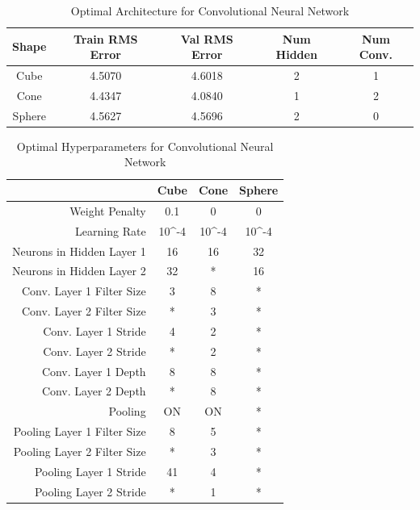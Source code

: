\documentclass[journal]{IEEEtran}
\begin{document}
\begin{table}
	\caption{Optimal Architecture for Convolutional Neural Network}
	\label{CNN_Params}
\begin{tabular}{|c|c|c|c|c|}
	\hline
	Shape & Train RMS Error & Val RMS Error & Num Hidden & Num Conv. \\
	\hline
	Cube & 4.5070 & 4.6018 & 2 & 1  \\
	Cone & 4.4347 & 4.0840 & 1 & 2\\
	Sphere &4.5627 & 4.5696  & 2 & 0\\
	\hline
\end{tabular}

\end{table}


\begin{table}
	\caption{Optimal Hyperparameters for Convolutional Neural Network}
	\label{CNN_Params}
	\begin{tabular}{|r|c|c|c|}
		\hline
     	&\multicolumn{1}{|c|}{Cube} & \multicolumn{1}{|c|}{Cone} &
     	\multicolumn{1}{|c|}{Sphere}\\
     	\hline
     	Weight Penalty  & 0.1 & 0 &0\\
     	\hline
     	Learning Rate  & 10^{-4} & 10^{-4} & 10^{-4}\\
     	\hline
     	Neurons in Hidden Layer 1  & 16 & 16  &32\\
		\hline
		Neurons in Hidden Layer 2  & 32 & * &16\\
		\hline
		Conv. Layer 1 Filter Size  & 3 & 8 &*\\
		\hline
		Conv. Layer 2 Filter Size  & * & 3 &*\\
		\hline
		Conv. Layer 1 Stride  & 4 & 2 &*\\
		\hline
		Conv. Layer 2 Stride  & * & 2 &*\\
		\hline
		Conv. Layer 1 Depth  & 8 & 8 &*\\
		\hline
		Conv. Layer 2 Depth  & * & 8 &*\\
		\hline
		Pooling  & ON & ON & *\\
		\hline
		Pooling Layer 1 Filter Size  & 8 & 5 &*\\
		\hline
		Pooling Layer 2 Filter Size  & * & 3 &*\\
		\hline
		Pooling Layer 1 Stride & 41 & 4 &*\\
		\hline
		Pooling Layer 2 Stride  & * & 1 &*\\
		

		\hline
	\end{tabular}
	
\end{table}
\end{document}
